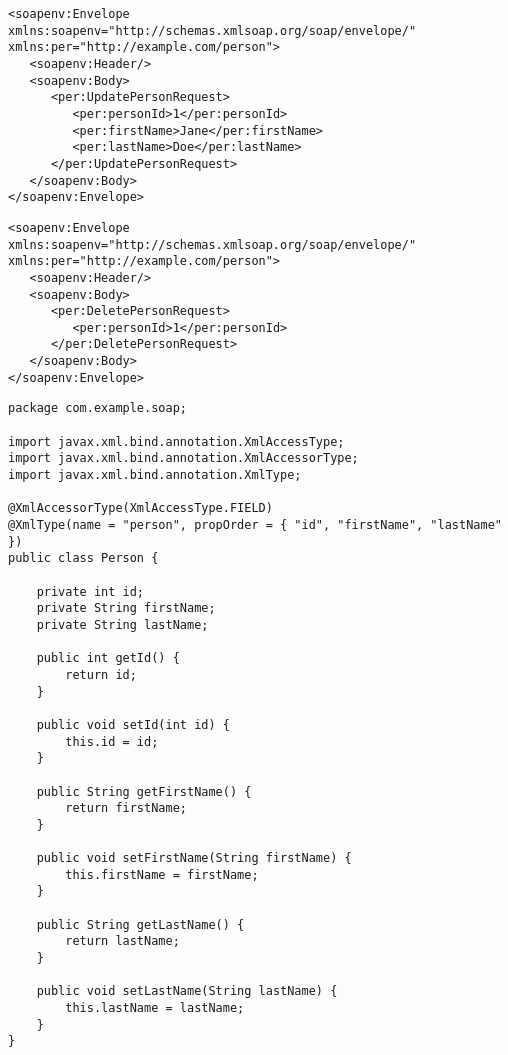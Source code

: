 \documentclass[../vs-script-first-v01.tex]{subfiles}
\begin{document}
\noindent\begin{minipage}{\textwidth}
\begin{lstlisting}[caption={SOAP read },captionpos=b,label={lst:s_read}]
<soapenv:Envelope xmlns:soapenv="http://schemas.xmlsoap.org/soap/envelope/" xmlns:per="http://example.com/person">
   <soapenv:Header/>
   <soapenv:Body>
      <per:UpdatePersonRequest>
         <per:personId>1</per:personId>
         <per:firstName>Jane</per:firstName>
         <per:lastName>Doe</per:lastName>
      </per:UpdatePersonRequest>
   </soapenv:Body>
</soapenv:Envelope>
\end{lstlisting}
\end{minipage}
\noindent\begin{minipage}{\textwidth}
\begin{lstlisting}[caption={SOAP delete},captionpos=b,label={lst:s_delete}]
<soapenv:Envelope xmlns:soapenv="http://schemas.xmlsoap.org/soap/envelope/" xmlns:per="http://example.com/person">
   <soapenv:Header/>
   <soapenv:Body>
      <per:DeletePersonRequest>
         <per:personId>1</per:personId>
      </per:DeletePersonRequest>
   </soapenv:Body>
</soapenv:Envelope>
\end{lstlisting}
\end{minipage}
\noindent\begin{minipage}{\textwidth}
\begin{lstlisting}[caption={SOAP Class Person},captionpos=b,label={lst:soap_person}]
package com.example.soap;

import javax.xml.bind.annotation.XmlAccessType;
import javax.xml.bind.annotation.XmlAccessorType;
import javax.xml.bind.annotation.XmlType;

@XmlAccessorType(XmlAccessType.FIELD)
@XmlType(name = "person", propOrder = { "id", "firstName", "lastName" })
public class Person {

    private int id;
    private String firstName;
    private String lastName;

    public int getId() {
        return id;
    }

    public void setId(int id) {
        this.id = id;
    }

    public String getFirstName() {
        return firstName;
    }

    public void setFirstName(String firstName) {
        this.firstName = firstName;
    }

    public String getLastName() {
        return lastName;
    }

    public void setLastName(String lastName) {
        this.lastName = lastName;
    }
}
\end{lstlisting}
\end{minipage}
\end{document}
